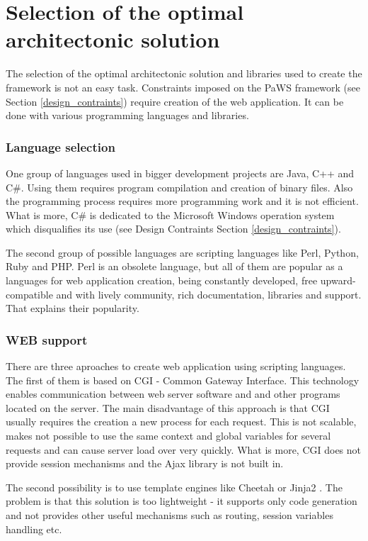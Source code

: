 \section{Selection of the optimal architectonic solution}

The selection of the optimal architectonic solution and libraries used to create the framework is not an easy task. Constraints imposed on the PaWS framework (see Section \ref{design_contraints}) require creation of the web application. It can be done with various programming languages and libraries. 

\subsubsection{Language selection}

One group of languages used in bigger development projects are Java, C++ and C\#. Using them requires program compilation and creation of binary files. Also the programming process requires more programming work and it is not efficient. What is more, C\# is dedicated to the Microsoft Windows operation system which disqualifies its use (see Design Contraints Section \ref{design_contraints}).

The second group of possible languages are scripting languages like Perl, Python, Ruby and PHP. Perl is an obsolete language, but all of them are popular as a languages for web application creation, being constantly developed, free upward-compatible and with lively community, rich documentation, libraries and support. That explains their popularity.

\subsubsection{WEB support}

There are three aproaches to create web application using scripting languages. The first of them is based on CGI\cite{cgi} - Common Gateway Interface. This technology enables communication between web server software and and other programs located on the server. The main disadvantage of this approach is that CGI usually requires the creation a new process for each request. This is not scalable, makes not possible to use the same context and global variables for several requests and can cause server load over very quickly. What is more, CGI does not provide session mechanisms and the Ajax library is not built in.

The second possibility is to use template engines like Cheetah \cite{cheetah} or Jinja2 \cite{jinja2}. The problem is that this solution is too lightweight - it supports only code generation and not provides other useful mechanisms such as routing, session variables handling etc.

